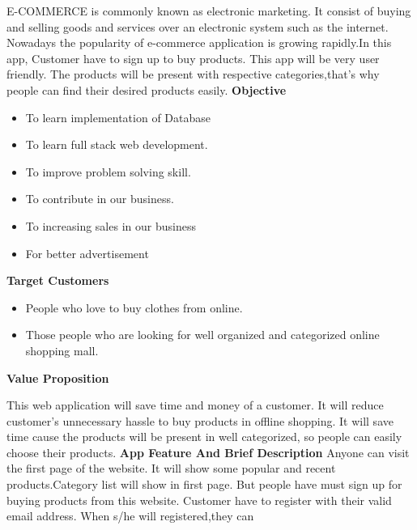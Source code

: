 \documentclass{article}
\begin{document}
\justify\Large{E-COMMERCE is commonly known as electronic marketing. It consist of buying and selling goods and services over an electronic system such as the internet. Nowadays the popularity of e-commerce application is growing rapidly.In this app, Customer have to sign up to buy products. This app will be very user friendly. The products will be present with respective categories,that's why people can find their desired products easily.}
\linebreak
\linebreak
\huge\textbf{Objective}
\begin{itemize}
    \item To learn implementation of Database
    \item To learn full stack web development.
    \item To improve problem solving skill.
    \item To contribute in our business.
    \item To increasing sales in our business
    \item For better advertisement 
    
\end{itemize}
\huge\textbf{Target Customers}
\begin{itemize}
    \item People who love to buy clothes from online. 
    \item Those people who are looking for well organized and categorized online shopping mall.
\end{itemize}
\huge\textbf{Value Proposition}

\justify\Large{This web application will save time and money of a customer. It will reduce customer's unnecessary hassle to buy products in offline shopping. It will save time cause the products will be present in well categorized, so people can easily choose their products.}
\linebreak
\linebreak
\huge\textbf{App Feature And Brief Description}
\linebreak
\Large{Anyone can visit the first page of the website. It will show some popular and recent products.Category list will show in first page. But people have must sign up for buying products from this website. Customer have to register with their valid email address. When s/he will registered,they can}
\end{document}
